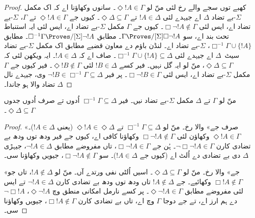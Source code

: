 \documentclass[../../../include/open-logic-section]{subfiles}
\begin{document}
{\begin{proof}
  کھبے توں سجے والے رخ لئی منّ لو $\Diamond !A \in \Gamma$۔ سانوں وکھاؤنا اے کہ اک مکمل $\Sigma$-بے تضاد $\Delta$
  اے جیہدے لئی $!A \in \Delta$ تے $\Diamond\Delta \subseteq \Gamma$۔ کیوں جے
  $\Diamond !A \in \Gamma$ تے $\Gamma$، $\Sigma$-بے تضاد اے، ایس لئی
  $\Box\lnot !A \notin \Gamma$۔ کیوں جے $\Gamma$ مکمل
  $\Sigma$-بے تضاد اے، ایس لئی ایہ استنباط تحت بند اے، سو $\Gamma
  \Proves/[\Sigma] \Box\lnot !A$۔  مطابق
  $\Box^{-1}\Gamma \Proves/[\Sigma] \lnot !A$۔
   مطابق
  $\Box^{-1}\Gamma \cup \{ !A \}$، $\Sigma$-بے تضاد اے۔ لنڈن باؤم دے معاون قضیے مطابق اک مکمل $\Sigma$-بے تضاد
  سیٹ~$\Delta$ اے جیہدے لئی $\Box^{-1}\Gamma \cup \{ !A \} \subseteq
  \Delta$۔ صاف اے کہ $!A \in \Delta$۔ ایہ ویکھن لئی کہ $\Diamond\Delta
  \subseteq \Gamma$، منّ لو ایہ گل نہیں۔ فیر کسے $!B \in \Delta$ لئی
  $\Diamond !B \notin \Gamma$۔ فیر کیوں جے $\Gamma$ مکمل
  $\Sigma$-بے تضاد اے، ایس لئی $\Box\lnot !B \in \Gamma$۔ پر فیر $\lnot
  !B \in \Box^{-1}\Gamma \subseteq \Delta$ وی، جیہدے نال $\Delta$
  تضاد والا ہو جاندا۔
\end{proof}
}

\begin{lem}
  منّ لو $\Gamma$ تے $\Delta$ مکمل
  $\Sigma$-بے تضاد نیں۔ فیر $\Box^{-1}\Gamma \subseteq \Delta$ اُدوں تے صرف اُدوں جدوں $\Diamond\Delta \subseteq \Gamma$۔
\end{lem}

\begin{proof}
  «صرف جے» والا رخ۔ منّ لو $\Box^{-1}\Gamma \subseteq \Delta$ تے
  $\Diamond!A \in \Diamond\Delta$ (یعنی $!A \in \Delta$)۔
  $\Diamond!A \in \Gamma$ وکھاؤن لئی
  $\Box\lnot!A \notin \Gamma$ وکھاؤنا کافی اے، کیوں جے فیر ودھ توں ودھ بے تضادی کارن $\lnot\Box\lnot
  !A \in \Gamma$۔ ہُن جے $\Box\lnot!A \in \Gamma$، تاں مفروضے مطابق
  $\lnot!A \in \Delta$، جیہڑی $\Delta$ دی بے تضادی دے اُلٹ اے (کیوں جے $!A
  \in \Delta$)۔ سو $\Box\lnot!A \notin \Gamma$، جیویں وکھاؤنا سی۔

  «جے» والا رخ۔ منّ لو $\Diamond\Delta
  \subseteq \Gamma$۔ اسیں اُلٹی نفی ورتدے آں۔ منّ لو $!A
  \notin \Delta$، تاں جو $\Box!A \notin \Gamma$ وکھائیے۔ جے
  $!A \notin \Delta$ تاں ودھ توں ودھ بے تضادی کارن $\lnot!A \in \Delta$
  تے ایس لئی مفروضے مطابق $\Diamond\lnot!A \in \Gamma$۔ پر کسے نارمل امکانی منطق وچ $\Diamond\lnot!A$،
  $\lnot\Box !A$ دے ہم ارز اے، تے جے دوجا $\Gamma$ وچ اے، تاں بے تضادی کارن
  $\Box!A \notin\Gamma$، جیویں وکھاؤنا سی۔
\end{proof}
\end{document}
